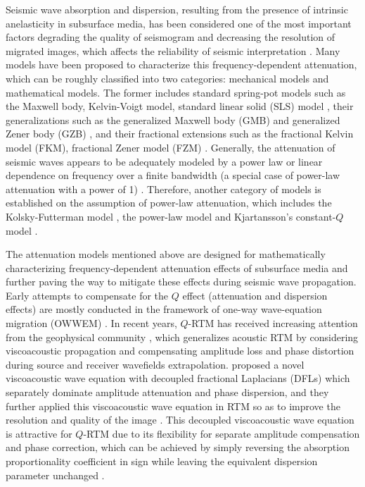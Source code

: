 Seismic wave absorption and dispersion, resulting from the presence of intrinsic anelasticity in subsurface media, has been considered one of the most important factors degrading the quality of seismogram and decreasing the resolution of migrated images, which affects the reliability of seismic interpretation \citep{Wang2004Seismic, carcione2007wave, wang2018L}. Many models have been proposed to characterize this frequency-dependent attenuation, which can be roughly classified into two categories: mechanical models and mathematical models. The former includes standard spring-pot models such as the Maxwell body, Kelvin-Voigt model, standard linear solid (SLS) model \citep{carcione2007wave, mainardi2010fractional}, their generalizations such as the generalized Maxwell body (GMB) and generalized Zener body (GZB) \citep{moczo2005rheological, cao2014equivalence}, and their fractional extensions such as the fractional Kelvin model (FKM), fractional Zener model (FZM) \citep{rossikhin2010application, nasholm2013fractional}. Generally, the attenuation of seismic waves appears to be adequately modeled by a power law \citep{strick1967determination, szabo1994time, szabo1995causal} or linear dependence on frequency over a finite bandwidth (a special case of power-law attenuation with a power of 1) \citep{mcdonal1958attenuation, futterman1962dispersive, kjartansson1979constant}. Therefore, another category of models is established on the assumption of power-law attenuation, which includes the Kolsky-Futterman model \citep{kolsky1956lxxi, futterman1962dispersive}, the power-law model and Kjartansson's constant-$Q$ model \citep{kjartansson1979constant}. 

The attenuation models mentioned above are designed for mathematically characterizing frequency-dependent attenuation effects of subsurface media and further paving the way to mitigate these effects during seismic wave propagation. Early attempts to compensate for the $Q$ effect (attenuation and dispersion effects) are mostly conducted in the framework of one-way wave-equation migration (OWWEM) \citep{Dai1994Inverse, mittet1995prestack, Wang2004Seismic, mittet2007simple, zhang2012compensation}. In recent years, $Q$-RTM has received increasing attention from the geophysical community \citep{Causse2000Viscoacoustic, Zhang2010Compensating, Zhu2014Q, Li2016Efficient, sun2016q, guo2016comparison, wang2018adaptive}, which generalizes acoustic RTM by considering viscoacoustic propagation and compensating amplitude loss and phase distortion during source and receiver wavefields extrapolation.  \cite{Zhu2014Modeling} proposed a novel viscoacoustic wave equation with decoupled fractional Laplacians (DFLs) which separately dominate amplitude attenuation and phase dispersion, and they further applied this viscoacoustic wave equation in RTM so as to improve the resolution and quality of the image \citep{Zhu2014Q}. This decoupled viscoacoustic wave equation is attractive for $Q$-RTM due to its flexibility for separate amplitude compensation and phase correction, which can be achieved by simply reversing the absorption proportionality coefficient in sign while leaving the equivalent dispersion parameter unchanged \citep{Treeby2010Photoacoustic, Zhu2014Q}. 

